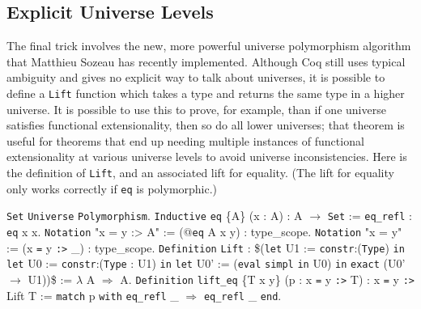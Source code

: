 \documentclass{article}
\makeatletter
\gdef\@makeopenbrace<\catcode`{>
\gdef\@makeclosebrace<\catcode`}>
\newcommand{\processcommands}[1]{{%
  \catcode`\\=0\relax
  \@makeopenbrace=1\relax
  \@makeclosebrace=2\relax
  \def\{{\texttt{\mytextbraceleft}}
  \def\}{\texttt{\mytextbraceright}}
  \scantokens{#1}%
}}
\newcommand{\processcommandsinverbatimline}{\expandafter\processcommands\expandafter{\the\verbatim@line}}
\newenvironment{coqcode}{\begingroup
  \vspace{0.5\baselineskip}
  \let\trivlist\relax
  \let\endtrivlist\relax
  \let\item\relax
  \setlength{\parsep}{0pt}%
  \setlength{\parskip}{0pt}%
  \setlength{\topsep}{0pt}%
  \setlength{\@topsepadd}{0pt}%
  \setlength{\partopsep}{0pt}%
  \setlength{\@topsep}{0pt}%
  \let\old@@par\@@par
  \let\@@par\relax
  \let\old@vskip\vskip
  \let\vskip\relax
  \verbatim
  \let\@@par\old@@par
  \let\vskip\old@vskip
  \let\verbatim@processline=\processcommandsinverbatimline
}{\endverbatim\endgroup\vspace{0.5\baselineskip}}
\newcommand{\coqdockw}[1]{\texttt {\textcolor{kwred}{#1}}}
\newcommand{\coqdocvar}[1]{\textcolor{varpurple}{#1}}
\newcommand{\coqdoccst}[1]{\texttt{\textcolor{defgreen}{#1}}}%
\newcommand{\coqdocind}[1]{\texttt{\textcolor{indblue}{#1}}}%
\newcommand{\coqdocconstr}[1]{\texttt {\textcolor{constrmaroon}{#1}}}
\newcommand{\coqdoctac}[1]{\texttt{#1}}
\newcommand{\coqdocinductive}[1]{\coqdocind{#1}}
\newcommand{\coqdocdefinition}[1]{\coqdoccst{#1}}
\newcommand{\coqdocconstructor}[1]{\coqdocconstr{#1}}
\newcommand{\coqdocnotation}[1]{\coqdockw{#1}}
\makeatother
\begin{document}
\subsection{Explicit Universe Levels}
The final trick involves the new, more powerful universe polymorphism algorithm that Matthieu Sozeau has recently implemented.  Although Coq still uses typical ambiguity and gives no explicit way to talk about universes, it is possible to define a \texttt{Lift} function which takes a type and returns the same type in a higher universe.  It is possible to use this to prove, for example, than if one universe satisfies functional extensionality, then so do all lower universes; that theorem is useful for theorems that end up needing multiple instances of functional extensionality at various universe levels to avoid universe inconsistencies.  Here is the definition of \texttt{Lift}, and an associated lift for equality.  (The lift for equality only works correctly if \texttt{eq} is polymorphic.)
\begin{coqcode}
\coqdockw{Set} \coqdockw{Universe} \coqdockw{Polymorphism}.
\coqdockw{Inductive} \coqdocinductive{eq} \{\coqdocvar{A}\} (\coqdocvar{x} : \coqdocvar{A}) : \coqdocvar{A} \coqdocnotation{\ensuremath{\rightarrow}} \coqdockw{Set} := \coqdocconstructor{eq_refl} : \coqdocinductive{eq} \coqdocvar{x} \coqdocvar{x}.
\coqdockw{Notation} "x = y :> A" := (@\coqdocinductive{eq} \coqdocvar{A} \coqdocvar{x} \coqdocvar{y}) : \coqdocvar{type_scope}.
\coqdockw{Notation} "x = y" := (\coqdocvar{x} \coqdocnotation{=} \coqdocvar{y} \coqdocnotation{:>} \coqdocvar{_}) : \coqdocvar{type_scope}.
\coqdockw{Definition} \coqdocdefinition{Lift}
 : \$(\coqdockw{let} \coqdocvar{U1} := \coqdockw{constr}:(\coqdockw{Type}) \coqdoctac{in}
     \coqdockw{let} \coqdocvar{U0} := \coqdockw{constr}:(\coqdockw{Type} : \coqdocvar{U1}) \coqdoctac{in}
     \coqdockw{let} \coqdocvar{U0'} := (\coqdoctac{eval} \coqdoctac{simpl} \coqdoctac{in} \coqdocvar{U0}) \coqdoctac{in}
     \coqdoctac{exact} (\coqdocvar{U0'} \coqdocnotation{\ensuremath{\rightarrow}} \coqdocvar{U1}))\$
    := \coqdockw{\ensuremath{\lambda}} \coqdocvar{A} \ensuremath{\Rightarrow} \coqdocvar{A}.
\coqdockw{Definition} \coqdocdefinition{lift_eq} \{\coqdocvar{T} \coqdocvar{x} \coqdocvar{y}\} (\coqdocvar{p} : \coqdocvar{x} \coqdocnotation{=} \coqdocvar{y} \coqdocnotation{:>} \coqdocvar{T}) : \coqdocvar{x} \coqdocnotation{=} \coqdocvar{y} \coqdocnotation{:>} \coqdocvar{Lift} \coqdocvar{T}
    := \coqdockw{match} \coqdocvar{p} \coqdockw{with} \coqdocconstructor{eq_refl} \coqdocvar{_} \ensuremath{\Rightarrow} \coqdocconstructor{eq_refl} \coqdocvar{_} \coqdockw{end}.
\end{coqcode}
\end{document}
